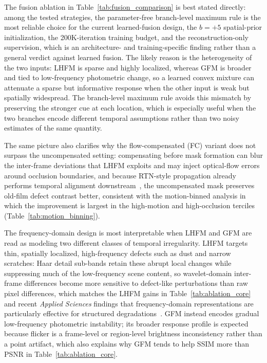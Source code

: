 {The fusion ablation in Table~\ref{tab:fusion_comparison} is best stated directly: among the tested strategies, the parameter-free branch-level maximum rule is the most reliable choice for the current learned-fusion design, the $b=+5$ spatial-prior initialization, the 200K-iteration training budget, and the reconstruction-only supervision, which is an architecture- and training-specific finding rather than a general verdict against learned fusion. The likely reason is the heterogeneity of the two inputs: LHFM is sparse and highly localized, whereas GFM is broader and tied to low-frequency photometric change, so a learned convex mixture can attenuate a sparse but informative response when the other input is weak but spatially widespread. The branch-level maximum rule avoids this mismatch by preserving the stronger cue at each location, which is especially useful when the two branches encode different temporal assumptions rather than two noisy estimates of the same quantity.

The same picture also clarifies why the flow-compensated (FC) variant does not surpass the uncompensated setting: compensating before mask formation can blur the inter-frame deviations that LHFM exploits and may inject optical-flow errors around occlusion boundaries, and because RTN-style propagation already performs temporal alignment downstream~\cite{rtn2022,rrtn2024}, the uncompensated mask preserves old-film defect contrast better, consistent with the motion-binned analysis in which the improvement is largest in the high-motion and high-occlusion terciles (Table~\ref{tab:motion_binning}).

The frequency-domain design is most interpretable when LHFM and GFM are read as modeling two different classes of temporal irregularity. LHFM targets thin, spatially localized, high-frequency defects such as dust and narrow scratches: Haar detail sub-bands retain these abrupt local changes while suppressing much of the low-frequency scene content, so wavelet-domain inter-frame differences become more sensitive to defect-like perturbations than raw pixel differences, which matches the LHFM gains in Table~\ref{tab:ablation_core} and recent \textit{Applied Sciences} findings that frequency-domain representations are particularly effective for structured degradations~\cite{kim2025hybrid,park2025spatialfrequency}. GFM instead encodes gradual low-frequency photometric instability; its broader response profile is expected because flicker is a frame-level or region-level brightness inconsistency rather than a point artifact, which also explains why GFM tends to help SSIM more than PSNR in Table~\ref{tab:ablation_core}.

}
